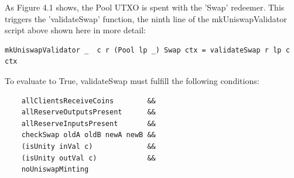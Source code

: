 \documentclass[a4paper,twoside,12pt]{report}
\begin{document}
As Figure 4.1 shows, the Pool UTXO is spent with the 'Swap' redeemer. This triggers the 'validateSwap' function, the ninth line of the mkUniswapValidator script above shown here in more detail: 

\begin{verbatim}
mkUniswapValidator _  c r (Pool lp _) Swap ctx = validateSwap r lp c ctx
\end{verbatim}

To evaluate to True, validateSwap must fulfill the following conditions:

\begin{verbatim}
    allClientsReceiveCoins        &&
    allReserveOutputsPresent      &&
    allReserveInputsPresent       &&
    checkSwap oldA oldB newA newB &&
    (isUnity inVal c)             &&
    (isUnity outVal c)            &&
    noUniswapMinting
\end{verbatim}
\end{document}
